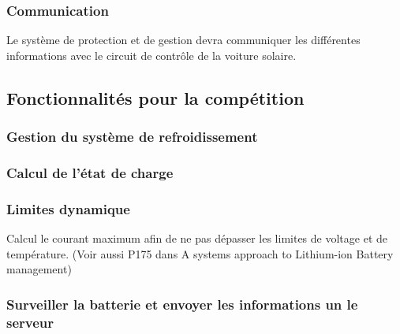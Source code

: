 		\subsubsection{Communication}
		Le système de protection et de gestion devra communiquer les différentes informations avec le circuit de contrôle de la voiture solaire. 
	
	\subsection{Fonctionnalités pour la compétition}
		\subsubsection{Gestion du système de refroidissement}
		
		\subsubsection{Calcul de l'état de charge}
		
		\subsubsection{Limites dynamique}
		Calcul le courant maximum afin de ne pas dépasser les limites de voltage et de température. (Voir aussi P175 dans A systems approach to Lithium-ion Battery management)
		
		\subsubsection{Surveiller la batterie et envoyer les informations un le serveur}
		
		